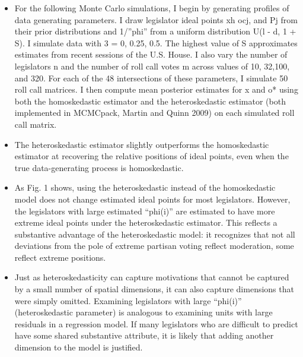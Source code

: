 \documentclass[a4paper,12pt]{article}
\begin{document}
\begin{enumerate}
\begin{itemize}
\item For the following Monte Carlo simulations, I begin by generating profiles of data generating parameters. I draw legislator ideal points xh ocj, and Pj from their prior distributions and 1/”phi” from a uniform distribution U(l - d, 1 + S). I simulate data with 3 = 0, 0.25, 0.5. The highest value of S approximates estimates from recent sessions of the U.S. House. I also vary the number of legislators n and the number of roll call votes m across values of 10, 32,100, and 320. For each of the 48 intersections of these parameters, I simulate 50 roll call matrices. I then compute mean posterior estimates for x and o* using both the homoskedastic estimator and the heteroskedastic estimator (both implemented in MCMCpack, Martin and Quinn 2009) on each simulated roll call matrix. 
\item The heteroskedastic estimator slightly outperforms the homoskedastic estimator at recovering the relative positions of ideal points, even when the true data-generating process is homoskedastic. 
\item As Fig. 1 shows, using the heteroskedastic instead of the homoskedastic model does not change estimated ideal points for most legislators. However, the legislators with large estimated “phi(i)” are estimated to have more extreme ideal points under the heteroskedastic estimator. This reflects a substantive advantage of the heteroskedastic model: it recognizes that not all deviations from the pole of extreme partisan voting reflect moderation, some reflect extreme positions. 
\item Just as heteroskedasticity can capture motivations that cannot be captured by a small number of spatial dimensions, it can also capture dimensions that were simply omitted. Examining legislators with large “phi(i)” (heteroskedastic parameter) is analogous to examining units with large residuals in a regression model. If many legislators who are difficult to predict have some shared substantive attribute, it is likely that adding another dimension to the model is justified.
\end{itemize}


\newpage



\end{enumerate}
\end{document}

